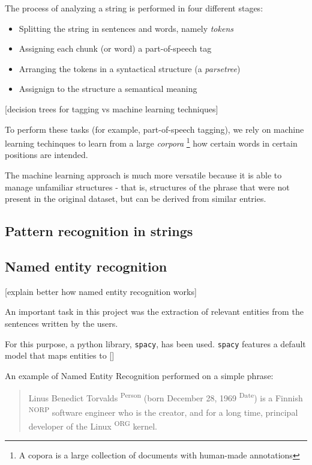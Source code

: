 \documentclass[LaM,binding=0.6cm]{sapthesis}
\begin{document}
The process of analyzing a string is performed in four different stages:
\begin{itemize}
	\item Splitting the string in sentences and words, namely \textit{tokens}
	\item Assigning each chunk (or word) a part-of-speech tag
	\item Arranging the tokens in a syntactical structure (a \textit{parsetree})
	\item Assignign to the structure a semantical meaning
\end{itemize}

[decision trees for tagging vs machine learning techniques]

To perform these tasks (for example, part-of-speech tagging), we rely on machine learning techinques to learn from a large \textit{corpora} \footnote{A copora is a large collection of documents with human-made annotations} how certain words in certain positions are intended.

The machine learning approach is much more versatile because it is able to manage unfamiliar structures - that is, structures of the phrase that were not present in the original dataset, but can be derived from similar entries.

\subsection{Pattern recognition in strings}

\subsection{Named entity recognition}

[explain better how named entity recognition works]

An important task in this project was the extraction of relevant entities from the sentences written by the users.

For this purpose, a python library, \texttt{spacy}, has been used. \texttt{spacy} features a default model that maps entities to []

An example of Named Entity Recognition performed on a simple phrase:
\begin{quote}
Linus Benedict Torvalds \textsuperscript{Person} (born December 28, 1969 \textsuperscript{Date}) is a Finnish \textsuperscript{NORP} software engineer who is the creator, and for a long time, principal developer of the Linux \textsuperscript{ORG} kernel.
\end{quote}
\end{document}
